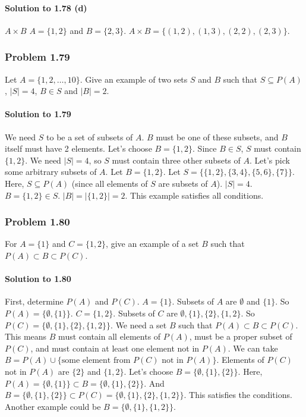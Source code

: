 \documentclass{article}
\begin{document}
\paragraph*{Solution to 1.78 (d)}
$A \times B$
$A = \{1, 2\}$ and $B = \{2, 3\}$.
$A \times B = \{(1, 2), (1, 3), (2, 2), (2, 3)\}$.

\subsubsection*{Problem 1.79}
Let $A = \{1, 2, \dots, 10\}$. Give an example of two sets $S$ and $B$ such that $S \subseteq P(A)$, $|S| = 4$, $B \in S$ and $|B| = 2$.

\paragraph*{Solution to 1.79}
We need $S$ to be a set of subsets of $A$. $B$ must be one of these subsets, and $B$ itself must have 2 elements.
Let's choose $B = \{1, 2\}$. Since $B \in S$, $S$ must contain $\{1, 2\}$.
We need $|S|=4$, so $S$ must contain three other subsets of $A$. Let's pick some arbitrary subsets of $A$.
Let $B = \{1, 2\}$.
Let $S = \{\{1, 2\}, \{3, 4\}, \{5, 6\}, \{7\}\}$.
Here, $S \subseteq P(A)$ (since all elements of $S$ are subsets of $A$).
$|S| = 4$.
$B = \{1, 2\} \in S$.
$|B| = |\{1, 2\}| = 2$.
This example satisfies all conditions.

\subsubsection*{Problem 1.80}
For $A = \{1\}$ and $C = \{1, 2\}$, give an example of a set $B$ such that $P(A) \subset B \subset P(C)$.

\paragraph*{Solution to 1.80}
First, determine $P(A)$ and $P(C)$.
$A = \{1\}$. Subsets of $A$ are $\emptyset$ and $\{1\}$. So $P(A) = \{\emptyset, \{1\}\}$.
$C = \{1, 2\}$. Subsets of $C$ are $\emptyset, \{1\}, \{2\}, \{1, 2\}$. So $P(C) = \{\emptyset, \{1\}, \{2\}, \{1, 2\}\}$.
We need a set $B$ such that $P(A) \subset B \subset P(C)$. This means $B$ must contain all elements of $P(A)$, must be a proper subset of $P(C)$, and must contain at least one element not in $P(A)$.
We can take $B = P(A) \cup \{\text{some element from } P(C) \text{ not in } P(A)\}$.
Elements of $P(C)$ not in $P(A)$ are $\{2\}$ and $\{1, 2\}$.
Let's choose $B = \{\emptyset, \{1\}, \{2\}\}$.
Here, $P(A) = \{\emptyset, \{1\}\} \subset B = \{\emptyset, \{1\}, \{2\}\}$.
And $B = \{\emptyset, \{1\}, \{2\}\} \subset P(C) = \{\emptyset, \{1\}, \{2\}, \{1, 2\}\}$.
This satisfies the conditions. Another example could be $B = \{\emptyset, \{1\}, \{1, 2\}\}$.
\end{document}

